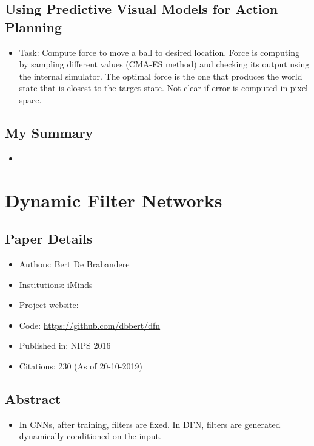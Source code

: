 \documentclass{article}
\begin{document}
    \subsection{Using Predictive Visual Models for Action Planning}\label{subsec:Learning_Visual_Predictive_Models_of_Physics_for_Playing_Billiards:action-planning}
    \begin{itemize}
        \item Task: Compute force to move a ball to desired location.
        Force is computing by sampling different values (CMA-ES method) and checking its output using the internal simulator.
        The optimal force is the one that produces the world state that is closest to the target state.
        Not clear if error is computed in pixel space.
    \end{itemize}

    \subsection{My Summary}\label{subsec:Learning_Visual_Predictive_Models_of_Physics_for_Playing_Billiards:my-summary}
    \begin{itemize}
        \item
    \end{itemize}
    \newpage


    \section{Dynamic Filter Networks}\label{sec:Dynamic_Filter_Networks}
    \subsection*{Paper Details}
    \begin{itemize}
        \item Authors: Bert De Brabandere
        \item Institutions: iMinds
        \item Project website:
        \item Code: \url{https://github.com/dbbert/dfn}
        \item Published in: NIPS 2016
        \item Citations: 230 (As of 20-10-2019)
    \end{itemize}

    \subsection*{Abstract}
    \begin{itemize}
        \item In CNNs, after training, filters are fixed.
        In DFN, filters are generated dynamically conditioned on the input.
    \end{itemize}
\end{document}
